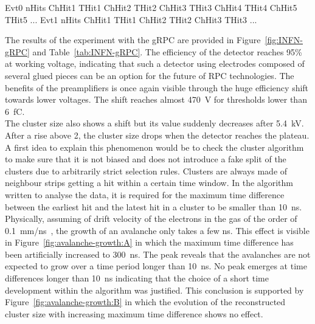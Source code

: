     \begin{code}
    \vspace{5mm}
    \begin{textcode}
Evt0	nHits
ChHit1	THit1
ChHit2	THit2
ChHit3	THit3
ChHit4	THit4
ChHit5	THit5
...
Evt1	nHits
ChHit1	THit1
ChHit2	THit2
ChHit3	THit3
...
    \end{textcode}
	\label{text:data}
	\vspace{5mm}
    \end{code}
    
    The results of the experiment with the gRPC are provided in Figure~\ref{fig:INFN-gRPC} and Table~\ref{tab:INFN-gRPC}. The efficiency of the detector reaches 95\% at working voltage, indicating that such a detector using electrodes composed of several glued pieces can be an option for the future of RPC technologies. The benefits of the preamplifiers is once again visible through the huge efficiency shift towards lower voltages. The shift reaches almost \SI{470}{V} for thresholds lower than \SI{6}{fC}.\\
    The cluster size also shows a shift but its value suddenly decreases after \SI{5.4}{kV}. After a rise above 2, the cluster size drops when the detector reaches the plateau. A first idea to explain this phenomenon would be to check the cluster algorithm to make sure that it is not biased and does not introduce a fake split of the clusters due to arbitrarily strict selection rules. Clusters are always made of neighbour strips getting a hit within a certain time window. In the algorithm written to analyse the data, it is required for the maximum time difference between the earliest hit and the latest hit in a cluster to be smaller than \SI{10}{ns}. Physically, assuming of drift velocity of the electrons in the gas of the order of \SI{0.1}{mm/ns}~\cite{DEURQUIJO2009}, the growth of an avalanche only takes a few \si{ns}. This effect is visible in Figure~\ref{fig:avalanche-growth:A} in which the maximum time difference has been artificially increased to \SI{300}{ns}. The peak reveals that the avalanches are not expected to grow over a time period longer than \SI{10}{ns}. No peak emerges at time differences longer than \SI{10}{ns} indicating that the choice of a short time development within the algorithm was justified. This conclusion is supported by Figure~\ref{fig:avalanche-growth:B} in which the evolution of the reconstructed cluster size with increasing maximum time difference shows no effect.
    
